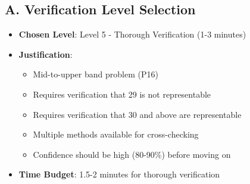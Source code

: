 \documentclass[12pt]{article}
\begin{document}
\begin{verificationbox}
\subsection*{A. Verification Level Selection}
\begin{itemize}[leftmargin=*]
    \item \textbf{Chosen Level}: Level 5 - Thorough Verification (1-3 minutes)
    \item \textbf{Justification}: 
    \begin{itemize}
        \item Mid-to-upper band problem (P16)
        \item Requires verification that 29 is not representable
        \item Requires verification that 30 and above are representable
        \item Multiple methods available for cross-checking
        \item Confidence should be high (80-90\%) before moving on
    \end{itemize}
    \item \textbf{Time Budget}: 1.5-2 minutes for thorough verification
\end{itemize}


\end{verificationbox}
\end{document}
